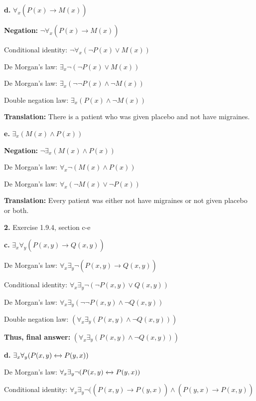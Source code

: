 \documentclass[11pt]{article}
\begin{document}
	\textbf{d.}
	$\forall_x (P(x)\xrightarrow[]{}M(x))$
	
	\textbf{Negation:}
	$\neg \forall_x (P(x)\xrightarrow[]{}M(x))$
	
	Conditional identity: $\neg \forall_x (\neg P(x)\vee M(x))$
	
	De Morgan's law: $\exists_x \neg (\neg P(x)\vee M(x))$
	
	De Morgan's law: $\exists_x (\neg \neg P(x)\wedge \neg M(x))$
	
	Double negation law: $\exists_x (P(x)\wedge \neg M(x))$
	
	\textbf{Translation:}
	There is a patient who was given placebo and not have migraines.
	\vspace{2mm}
	
	\textbf{e.}
	$\exists_x (M(x)\wedge P(x))$
	
	\textbf{Negation:}
	$\neg \exists_x (M(x)\wedge P(x))$
	
	De Morgan's law: $\forall_x \neg (M(x)\wedge P(x))$
	
	De Morgan's law: $\forall_x (\neg M(x)\vee \neg P(x))$
	
	\textbf{Translation:}
	Every patient was either not have migraines or not given placebo or both.
	
	
	\vspace{3mm}
	\textbf{2.} Exercise 1.9.4, section c-e
	\medskip
	
	\textbf{c.}
	$\exists_x \forall_y (P(x,y)\xrightarrow[]{}Q(x,y))$
	
	De Morgan's law: 
	$\forall_x \exists_y \neg (P(x,y)\xrightarrow[]{}Q(x,y))$
	
	Conditional identity:
	$\forall_x \exists_y \neg (\neg P(x,y)\vee Q(x,y))$
	
	De Morgan's law:
	$\forall_x \exists_y (\neg \neg P(x,y)\wedge \neg Q(x,y))$
	
	Double negation law:
	$(\forall_x \exists_y (P(x,y)\wedge \neg Q(x,y)))$
	
	\textbf{Thus, final answer: }
	$(\forall_x \exists_y (P(x,y)\wedge \neg Q(x,y)))$
	\vspace{2mm}
	
	\textbf{d.}
	$\exists_x \forall_y (P(x,y)\xleftrightarrow[]{}P(y,x))$
	
	De Morgan's law:
	$\forall_x \exists_y \neg (P(x,y)\xleftrightarrow[]{}P(y,x))$
	
	Conditional identity:
	$\forall_x \exists_y \neg ((P(x,y)\xrightarrow[]{}P(y,x))\wedge (P(y,x)\xrightarrow[]{}P(x,y))$
	
\end{document}
